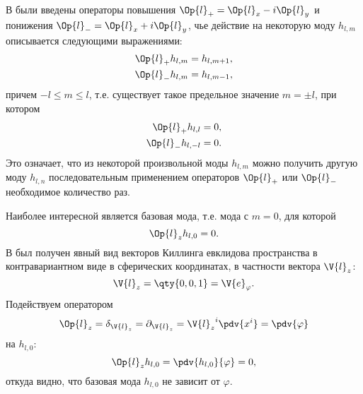     В \cite{math_appendix} были введены операторы повышения $\Op{l}_{+} = \Op{l}_x - i \Op{l}_y$ и понижения $\Op{l}_{-} = \Op{l}_x + i \Op{l}_y$, чье действие на некоторую моду $h_{l, m}$ описывается следующими выражениями:
    \begin{equation}\begin{aligned}
        \Op{l}_{+} h_{l, m} &= h_{l, m+1} , \\
        \Op{l}_{-} h_{l, m} &= h_{l, m-1} ,
    \end{aligned}\end{equation}
    причем $- l \le m \le l$, т.е. существует такое предельное значение $m = \pm l$, при котором
    \begin{equation}\begin{aligned}
        \Op{l}_{+} h_{l, l}   &= 0 , \\
        \Op{l}_{-} h_{l, - l} &= 0 .
    \end{aligned}\end{equation}
    Это означает, что из некоторой произвольной моды $h_{l, m}$ можно получить другую моду $h_{l, n}$ последовательным применением операторов $\Op{l}_{+}$ или $\Op{l}_{-}$ необходимое количество раз.

    Наиболее интересной является базовая мода, т.е. мода с $m = 0$, для которой
    \begin{equation}
        \Op{l}_z h_{l, 0} = 0 .
    \end{equation}
    В \cite{math_appendix} был получен явный вид векторов Киллинга евклидова пространства в контравариантном виде в сферических координатах, в частности вектора $\V{l}_z$:
    \begin{equation}
        \V{l}_z = \qty{ 0, 0, 1 } = \V{e}_\varphi .
    \end{equation}
    Подействуем оператором\footnotemark
    \begin{equation}
        \Op{l}_z
            = \delta_{\V{l}_z}
            = \partial_{\V{l}_z}
            = {\V{l}_z}^i \pdv{x^i}
            = \pdv{\varphi}
    \end{equation}
    на $h_{l, 0}$:
    \begin{equation}
        \Op{l}_z h_{l, 0} = \pdv{h_{l, 0}}{\varphi} = 0 ,
    \end{equation}
    откуда видно, что базовая мода $h_{l, 0}$ не зависит от $\varphi$.


